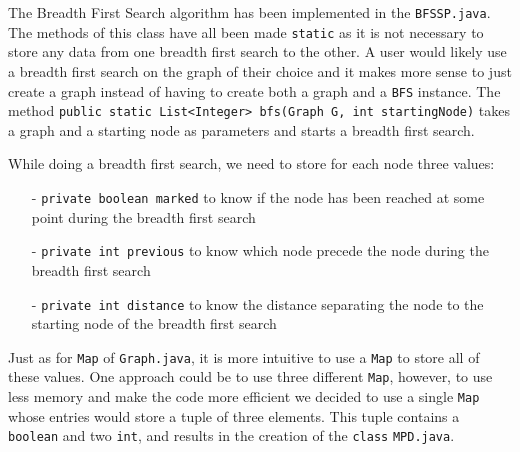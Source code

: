 \documentclass{article}
\begin{document}
The Breadth First Search algorithm has been implemented in the \texttt{BFSSP.java}. The methods of this class have all been made \texttt{static} as it is not necessary to store any data from one breadth first search to the other. A user would likely use a breadth first search on the graph of their choice and it makes more sense to just create a graph instead of having to create both a graph and a \texttt{BFS} instance. The method \texttt{public static List<Integer> bfs(Graph G, int startingNode)} takes a graph and a starting node as parameters and starts a breadth first search.

While doing a breadth first search, we need to store for each node three values:
\begin{itemize}
\item[-]\texttt{private boolean marked} to know if the node has been reached at some point during the breadth first search
\item[-]\texttt{private int previous} to know which node precede the node during the breadth first search
\item[-]\texttt{private int distance} to know the distance separating the node to the starting node of the breadth first search
\end{itemize}

Just as for \texttt{Map} of \texttt{Graph.java}, it is more intuitive to use a \texttt{Map} to store all of these values. One approach could be to use three different \texttt{Map}, however, to use less memory and make the code more efficient we decided to use a single \texttt{Map} whose entries would store a tuple of three elements. This tuple contains a \texttt{boolean} and two \texttt{int}, and results in the creation of the \texttt{class} \texttt{MPD.java}.
\end{document}
